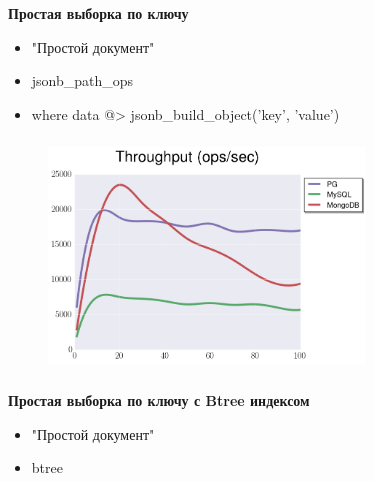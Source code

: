 \documentclass[usenames,dvipsnames, 18pt, compress, aspectratio=169]{beamer}
\begin{document}
\begin{frame}
    \frametitle{}
    \begin{center}
        \textbf{Простая выборка по ключу}
        \begin{itemize}[label={}]
            \item "Простой документ"
            \item jsonb\_path\_ops
            \item where data @> jsonb\_build\_object('key', 'value')
        \end{itemize}
    \end{center}
\end{frame}

\begin{frame}
    \frametitle{}
    \begin{center}
    \begin{figure}
        \includegraphics[width=0.75\textwidth,center]{benchmarks/select_jsonb_path_ops_no_parse_throughput.png}
    \end{figure}
    \end{center}
\end{frame}

\begin{frame}
    \frametitle{}
    \begin{center}
        \textbf{Простая выборка по ключу с Btree индексом}
        \begin{itemize}[label={}]
            \item "Простой документ"
            \item btree
        \end{itemize}
    \end{center}
\end{frame}
\end{document}
